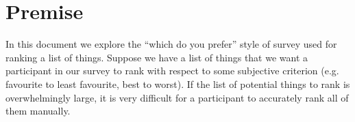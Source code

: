 \documentclass[12pt]{book}
\theoremstyle{definitionstyle}
\numberwithin{equation}{section}
\begin{document}
% 
% 
% 
% 
% 
% 
% 
% 
% 
% 
% 
% 
% 
% 
% 
% 
% 
%  
% 

\chapter*{Premise}
\setcounter{page}{1}

In this document we explore the ``which do you prefer'' style of survey used for ranking a list of things. Suppose we have a list of things that we want a participant in our survey to rank with respect to some subjective criterion (e.g. favourite to least favourite, best to worst). If the list of potential things to rank is overwhelmingly large, it is very difficult for a participant to accurately rank all of them manually.
\end{document}
